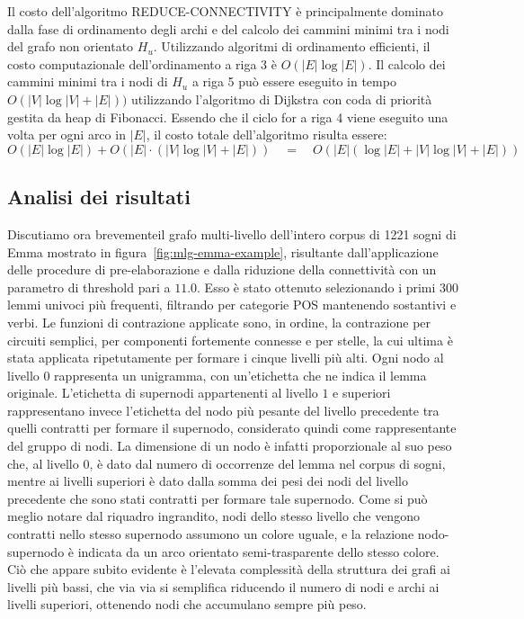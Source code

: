 Il costo dell'algoritmo REDUCE-CONNECTIVITY è principalmente dominato dalla fase di ordinamento degli archi
e del calcolo dei cammini minimi tra i nodi del grafo non orientato $H_u$.
Utilizzando algoritmi di ordinamento efficienti, il costo computazionale dell'ordinamento a riga 3 è $O(|E| \log |E|)$.
Il calcolo dei cammini minimi tra i nodi di $H_u$ a riga 5 può essere eseguito in tempo $O(|V| \log{|V|} + |E|))$
utilizzando l'algoritmo di Dijkstra con coda di priorità gestita da heap di Fibonacci.
Essendo che il ciclo for a riga 4 viene eseguito una volta per ogni arco in $|E|$, il costo totale dell'algoritmo
risulta essere:
\begin{equation*}
      O(|E| \log |E|) + O(|E| \cdot (|V| \log{|V|} + |E|)) \quad = \quad
      O(|E| (\log |E| + |V| \log{|V|} + |E|))
\end{equation*}

\subsection{Analisi dei risultati}\label{subsec:analisi-del-grafo-multi-livello}

Discutiamo ora brevementeil grafo multi-livello dell'intero corpus di 1221 sogni di Emma mostrato in
figura~\ref{fig:mlg-emma-example}, risultante dall'applicazione delle procedure di pre-elaborazione e dalla riduzione
della connettività con un parametro di threshold pari a $11.0$.
Esso è stato ottenuto selezionando i primi 300 lemmi univoci più frequenti, filtrando per categorie POS mantenendo
sostantivi e verbi.
Le funzioni di contrazione applicate sono, in ordine, la contrazione per circuiti semplici,
per componenti fortemente connesse e per stelle, la cui ultima è stata applicata ripetutamente per
formare i cinque livelli più alti.
Ogni nodo al livello $0$ rappresenta un unigramma, con un'etichetta che ne indica il lemma originale. L'etichetta di
supernodi appartenenti al livello $1$ e superiori rappresentano invece l'etichetta del nodo più pesante del livello
precedente tra quelli contratti per formare il supernodo, considerato quindi come rappresentante del gruppo di nodi.
La dimensione di un nodo è infatti proporzionale al suo peso che, al livello $0$, è dato dal numero di occorrenze del
lemma nel corpus di sogni, mentre ai livelli superiori è dato dalla somma dei pesi dei nodi del livello precedente che
sono stati contratti per formare tale supernodo.
Come si può meglio notare dal riquadro ingrandito, nodi dello stesso livello che vengono contratti nello stesso
supernodo assumono un colore uguale, e la relazione nodo-supernodo è indicata da un arco orientato
semi-trasparente dello stesso colore.
Ciò che appare subito evidente è l'elevata complessità della struttura dei grafi ai livelli più bassi, che
via via si semplifica riducendo il numero di nodi e archi ai livelli superiori, ottenendo nodi che accumulano
sempre più peso.

